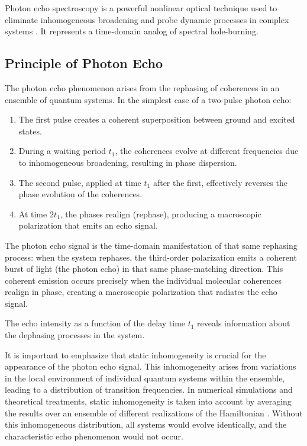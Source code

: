 \noindent Photon echo spectroscopy is a powerful nonlinear optical technique used to eliminate inhomogeneous broadening and probe dynamic processes in complex systems \cite{hybletal1998twodimensionalelectronicspectroscopy, mukamel1995principlesnonlinearoptical}. It represents a time-domain analog of spectral hole-burning.

\subsection{Principle of Photon Echo}
\label{subsec:echo_principle}

\noindent The photon echo phenomenon arises from the rephasing of coherences in an ensemble of quantum systems. In the simplest case of a two-pulse photon echo:

\begin{enumerate}
	\item The first pulse creates a coherent superposition between ground and excited states.
	\item During a waiting period $t_1$, the coherences evolve at different frequencies due to inhomogeneous broadening, resulting in phase dispersion.
	\item The second pulse, applied at time $t_1$ after the first, effectively reverses the phase evolution of the coherences.
	\item At time $2t_1$, the phases realign (rephase), producing a macroscopic polarization that emits an echo signal.
\end{enumerate}

\noindent The photon echo signal is the time-domain manifestation of that same rephasing process: when the system rephases, the third-order polarization emits a coherent burst of light (the photon echo) in that same phase-matching direction. This coherent emission occurs precisely when the individual molecular coherences realign in phase, creating a macroscopic polarization that radiates the echo signal.

\noindent The echo intensity as a function of the delay time $t_1$ reveals information about the dephasing processes in the system.

\noindent It is important to emphasize that static inhomogeneity is crucial for the appearance of the photon echo signal. This inhomogeneity arises from variations in the local environment of individual quantum systems within the ensemble, leading to a distribution of transition frequencies. In numerical simulations and theoretical treatments, static inhomogeneity is taken into account by averaging the results over an ensemble of different realizations of the Hamiltonian \cite{cho2009twodimensionalopticalspectroscopy, mukamel1995principlesnonlinearoptical}. Without this inhomogeneous distribution, all systems would evolve identically, and the characteristic echo phenomenon would not occur.

